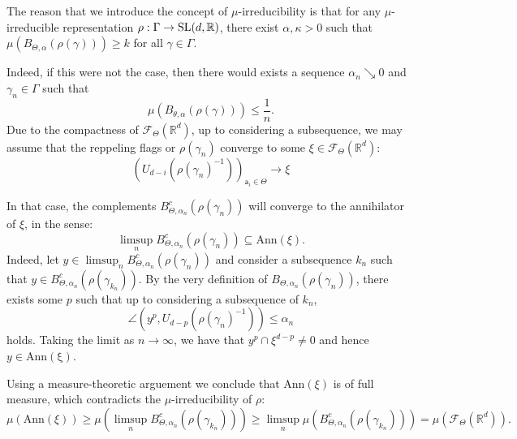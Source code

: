 \documentclass{report}
\begin{document}
\begin{remark}\label{rem:irredubility}
    The reason that we introduce the concept of $\mu$-irreducibility is that for any $\mu$-irreducible representation $\rho:\Gamma \to \operatorname{{\mathrm{SL}}}(d,\mathbb R)$, there exist $\alpha, \kappa > 0$ such that $\mu(B_{\Theta, \alpha}(\rho(\gamma))) \geq k$ for all $\gamma \in \Gamma$.

    Indeed, if this were not the case, then there would exists a sequence $\alpha_n \searrow 0$ and $\gamma_n \in \Gamma$ such that
    \[
        \mu(B_{\theta, \alpha}(\rho(\gamma))) \leq \frac{1}{n}.
    \]
    Due to the compactness of $\mathcal F_{\Theta} (\mathbb R^d)$, up to considering a subsequence, we may assume that the reppeling flags or $\rho(\gamma_n)$ converge to some $\xi \in \mathcal F_{\Theta} (\mathbb R^d)$:
    \[
        (U_{d-i}(\rho(\gamma_n)^{-1}))_{\mathsf a_i \in \Theta} \to \xi
    \]
    
    In that case, the complements $B_{\Theta, \alpha_n}^c(\rho(\gamma_n))$ will converge to the annihilator of $\xi$, in the sense:
    \[
        \limsup_n B_{\Theta, \alpha_n}^c(\rho(\gamma_n)) \subseteq \mathrm{Ann}(\xi).
    \]
    Indeed, let $y\in \limsup_n  B_{\Theta, \alpha_n}^c(\rho(\gamma_n))$ and consider a subsequence $k_n$ such that $y\in B_{\Theta, \alpha_n}^c(\rho(\gamma_{k_n}))$.
    By the very definition of $B_{\Theta, \alpha_n}(\rho(\gamma_n))$, there exists some $p$ such that up to considering a subsequence of $k_n$,
    \[
        \angle (y^p, U_{d-p}(\rho(\gamma_n)^{-1})) \leq \alpha_n
    \]
    holds.
    Taking the limit as $n \to \infty$, we have that $y^p \cap \xi^{d-p} \neq 0$ and hence $y \in \mathrm{Ann(\xi)}$.

    Using a measure-theoretic arguement we conclude that $\mathrm{Ann}(\xi)$ is of full measure, which contradicts the $\mu$-irreducibility of $\rho$:
    \[
        \mu(\mathrm{Ann}(\xi)) \geq
        \mu (\limsup_n B_{\Theta, \alpha_n}^c(\rho(\gamma_{k_n})) ) \geq 
        \limsup_n \mu (B_{\Theta, \alpha_n}^c(\rho(\gamma_{k_n}))) =
        \mu(\mathcal F_\Theta (\mathbb R^d)).
    \]
\end{remark}
\end{document}
